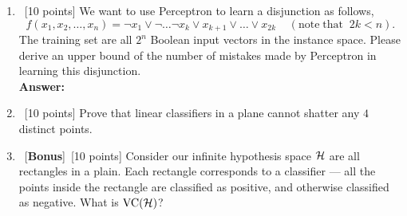 \documentclass[12pt, fullpage,letterpaper]{article}
\newcommand{\Answer}{{\\\textbf{Answer: }}}
\begin{document}
\begin{enumerate}
	\item~[10 points] We want to use Perceptron to learn a disjunction as follows,
	\[
	f(x_1, x_2, \ldots, x_n) = \neg x_1 \lor \neg \ldots \neg x_k \lor x_{k+1} \lor \ldots \lor x_{2k} \;\;\;\;(\mathrm{note\; that}\;\; 2k < n).
	\]
	The training set are all $2^n$ Boolean input vectors in the instance space. 
	Please derive an upper bound of the number of mistakes made by Perceptron in learning this disjunction.
	\Answer 

	\item~[10 points] Prove that linear classifiers in a plane cannot shatter any $4$ distinct points. 
	\item~[\textbf{Bonus}]~[10 points] Consider our infinite hypothesis space $\mathcal{H}$ are all rectangles in a plain. Each rectangle corresponds to a classifier --- all the points inside the rectangle are classified as positive, and otherwise classified as negative. What is $\mathrm{VC}(\mathcal{H})$? 


\end{enumerate}
\end{document}
